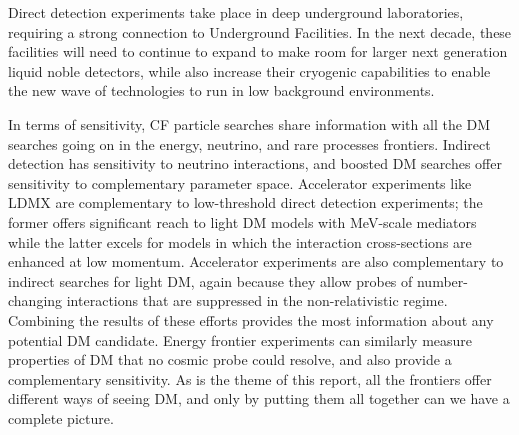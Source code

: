\documentclass[nofootinbib]{article}
\begin{document}
Direct detection experiments take place in deep underground laboratories, requiring a strong connection to Underground Facilities. In the next decade, these facilities will need to continue to expand to make room for larger next generation liquid noble detectors, while also increase their cryogenic capabilities to enable the new wave of technologies to run in low background environments. 

In terms of sensitivity, CF particle searches share information with all the DM searches going on in the energy, neutrino, and rare processes frontiers. Indirect detection has sensitivity to neutrino interactions, and boosted DM searches offer sensitivity to complementary parameter space. Accelerator experiments like LDMX are complementary to low-threshold direct detection experiments; the former offers significant reach to light DM models with MeV-scale mediators while the latter excels for models in which the interaction cross-sections are enhanced at low momentum. Accelerator experiments are also complementary to indirect searches for light DM, again because they allow probes of number-changing interactions that are suppressed in the non-relativistic regime. Combining the results of these efforts provides the most information about any potential DM candidate. Energy frontier experiments can similarly measure properties of DM that no cosmic probe could resolve, and also provide a complementary sensitivity. As is the theme of this report, all the frontiers offer different ways of seeing DM, and only by putting them all together can we have  a complete picture. 
\end{document}
